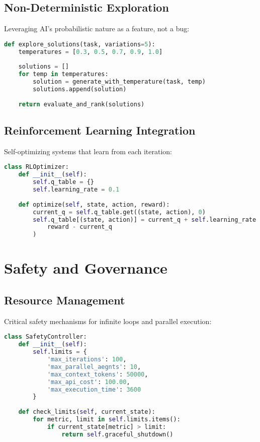 \documentclass[11pt]{article}
\begin{document}
\subsection{Non-Deterministic Exploration}

Leveraging AI's probabilistic nature as a feature, not a bug:

\begin{lstlisting}[language=Python]
def explore_solutions(task, variations=5):
    temperatures = [0.3, 0.5, 0.7, 0.9, 1.0]
    
    solutions = []
    for temp in temperatures:
        solution = generate_with_temperature(task, temp)
        solutions.append(solution)
    
    return evaluate_and_rank(solutions)
\end{lstlisting}

\subsection{Reinforcement Learning Integration}

Self-optimizing systems that learn from each iteration:

\begin{lstlisting}[language=Python]
class RLOptimizer:
    def __init__(self):
        self.q_table = {}
        self.learning_rate = 0.1
        
    def optimize(self, state, action, reward):
        current_q = self.q_table.get((state, action), 0)
        self.q_table[(state, action)] = current_q + self.learning_rate * (
            reward - current_q
        )
\end{lstlisting}

\section{Safety and Governance}

\subsection{Resource Management}

Critical safety mechanisms for infinite loops and parallel execution:

\begin{lstlisting}[language=Python]
class SafetyController:
    def __init__(self):
        self.limits = {
            'max_iterations': 100,
            'max_parallel_aegnts': 10,
            'max_context_tokens': 50000,
            'max_api_cost': 100.00,
            'max_execution_time': 3600
        }
    
    def check_limits(self, current_state):
        for metric, limit in self.limits.items():
            if current_state[metric] > limit:
                return self.graceful_shutdown()
\end{lstlisting}
\end{document}

